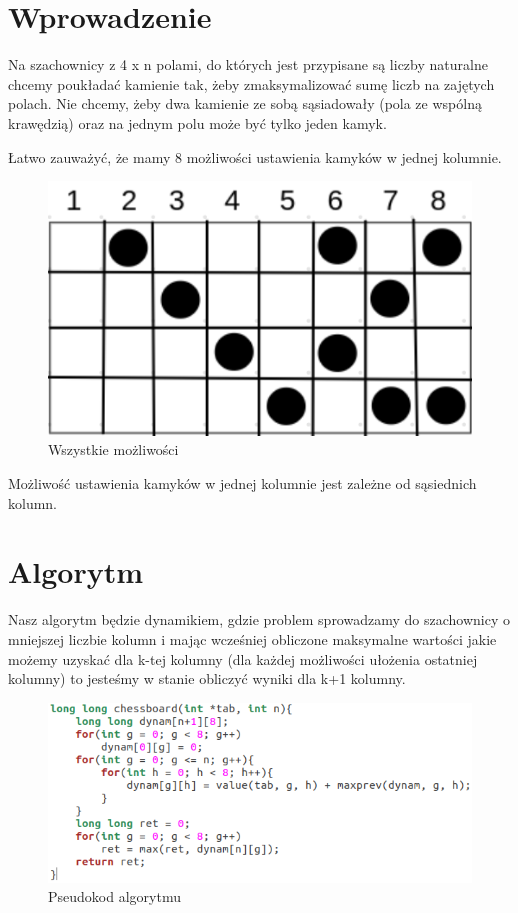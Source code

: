 \documentclass[12pt,a4paper]{article}
\begin{document}
\section{Wprowadzenie}
Na szachownicy z 4 x n polami, do których jest przypisane są liczby naturalne chcemy poukładać kamienie tak, żeby zmaksymalizować sumę liczb na zajętych polach. Nie chcemy, żeby dwa kamienie ze sobą sąsiadowały (pola ze wspólną krawędzią) oraz na jednym polu może być tylko jeden kamyk.

Łatwo zauważyć, że mamy 8 możliwości ustawienia kamyków w jednej kolumnie.

\begin{figure}[!htb]
\centering
\includegraphics[scale=0.45]{mozliwosci.png}
\caption{Wszystkie możliwości}
\end{figure}

Możliwość ustawienia kamyków w jednej kolumnie jest zależne od sąsiednich kolumn.
\section{Algorytm}
Nasz algorytm będzie dynamikiem, gdzie problem sprowadzamy do szachownicy o mniejszej liczbie kolumn i mając wcześniej obliczone maksymalne wartości jakie możemy uzyskać dla k-tej kolumny (dla każdej możliwości ułożenia ostatniej kolumny) to jesteśmy w stanie obliczyć wyniki dla k+1 kolumny.

\begin{figure}[!htb]
\centering
\includegraphics[scale=0.7]{algo2.png}
\caption{Pseudokod algorytmu}
\end{figure}
\end{document}
